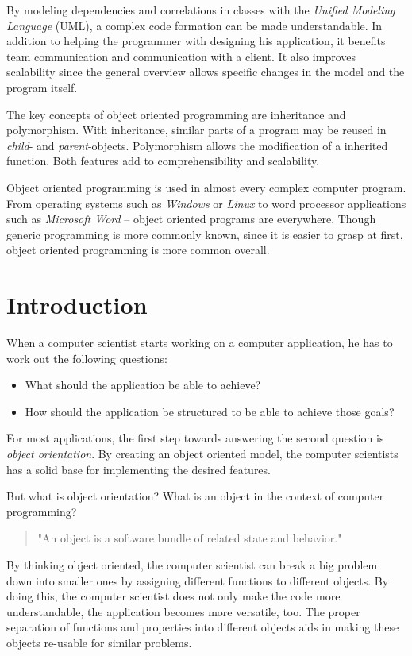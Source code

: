 By modeling dependencies and correlations in classes with the \emph{Unified Modeling Language} (UML), a complex code formation can be made understandable. In addition to helping the programmer with designing his application, it benefits team communication and communication with a client. It also improves scalability since the general overview allows specific changes in the model and the program itself.

The key concepts of object oriented programming are inheritance and polymorphism. With inheritance, similar parts of a program may be reused in \emph{child}- and \emph{parent}-objects. Polymorphism allows the modification of a inherited function. Both features add to comprehensibility and scalability.\medskip

Object oriented programming is used in almost every complex computer program. From operating systems such as \emph{Windows} or \emph{Linux} to word processor applications such as \emph{Microsoft Word} -- object oriented programs are everywhere. Though generic programming is more commonly known, since it is easier to grasp at first, object oriented programming is more common overall.

\chapter{Introduction}

When a computer scientist starts working on a computer application, he has to work out the following questions:
\begin{itemize}
\item What should the application be able to achieve?
\item How should the application be structured to be able to achieve those goals?
\end{itemize}
For most applications, the first step towards answering the second question is \emph{object orientation}. By creating an object oriented model, the computer scientists has a solid base for implementing the desired features.

But what is object orientation? What is an object in the context of computer programming? 
\begin{quote}
"An object is a software bundle of related state and behavior."
\cite{Oracle2016ObjectOrientedProgramming}
\end{quote}

By thinking object oriented, the computer scientist can break a big problem down into smaller ones by assigning different functions to different objects. By doing this, the computer scientist does not only make the code more understandable, the application becomes more versatile, too. The proper separation of functions and properties into different objects aids in making these objects re-usable for similar problems.

